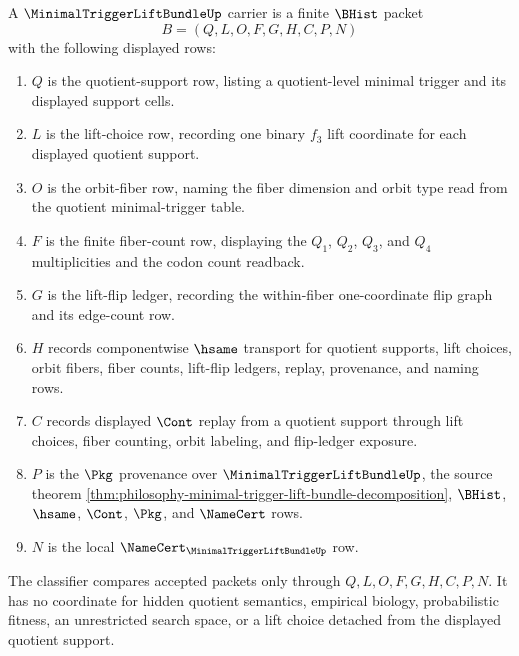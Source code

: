 \begin{definition}
\label{def:minimal-trigger-lift-bundle-carrier}
A $\MinimalTriggerLiftBundleUp$ carrier is a finite $\BHist$ packet
$$
B=(Q,L,O,F,G,H,C,P,N)
$$
with the following displayed rows:
\begin{enumerate}
\item $Q$ is the quotient-support row, listing a quotient-level minimal trigger and its displayed support cells.
\item $L$ is the lift-choice row, recording one binary $f_{3}$ lift coordinate for each displayed quotient support.
\item $O$ is the orbit-fiber row, naming the fiber dimension and orbit type read from the quotient minimal-trigger table.
\item $F$ is the finite fiber-count row, displaying the $Q_{1}$, $Q_{2}$, $Q_{3}$, and $Q_{4}$ multiplicities and the codon count readback.
\item $G$ is the lift-flip ledger, recording the within-fiber one-coordinate flip graph and its edge-count row.
\item $H$ records componentwise $\hsame$ transport for quotient supports, lift choices, orbit fibers, fiber counts, lift-flip ledgers, replay, provenance, and naming rows.
\item $C$ records displayed $\Cont$ replay from a quotient support through lift choices, fiber counting, orbit labeling, and flip-ledger exposure.
\item $P$ is the $\Pkg$ provenance over $\MinimalTriggerLiftBundleUp$, the source theorem \autoref{thm:philosophy-minimal-trigger-lift-bundle-decomposition}, $\BHist$, $\hsame$, $\Cont$, $\Pkg$, and $\NameCert$ rows.
\item $N$ is the local $\NameCert_{\MinimalTriggerLiftBundleUp}$ row.
\end{enumerate}
The classifier compares accepted packets only through $Q,L,O,F,G,H,C,P,N$. It has no coordinate for hidden quotient semantics, empirical biology, probabilistic fitness, an unrestricted search space, or a lift choice detached from the displayed quotient support.
\end{definition}


